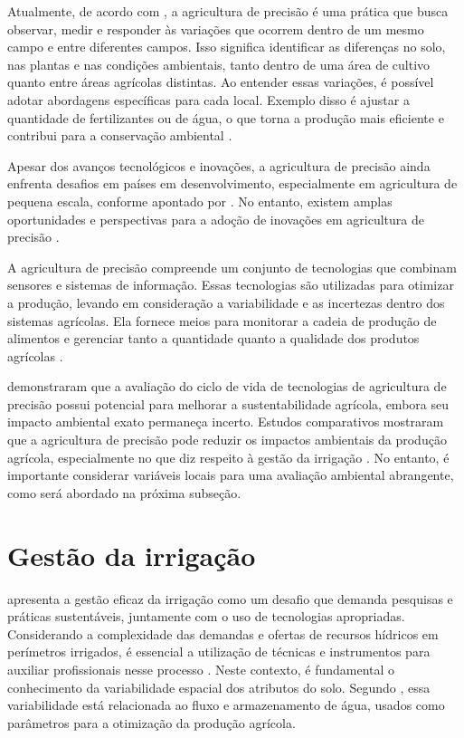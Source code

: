 Atualmente, de acordo com \textcite{Lamine_precision2024}, a agricultura de precisão é uma prática que busca observar, medir e responder às variações que ocorrem dentro de um mesmo campo e entre diferentes campos. Isso significa identificar as diferenças no solo, nas plantas e nas condições ambientais, tanto dentro de uma área de cultivo quanto entre áreas agrícolas distintas. Ao entender essas variações, é possível adotar abordagens específicas para cada local. Exemplo disso é ajustar a quantidade de fertilizantes ou de água, o que torna a produção mais eficiente e contribui para a conservação ambiental \parencite{Lamine_precision2024}.

Apesar dos avanços tecnológicos e inovações, a agricultura de precisão ainda enfrenta desafios em países em desenvolvimento, especialmente em agricultura de pequena escala, conforme apontado por \textcite{Lamine_precision2024}. No entanto, existem amplas oportunidades e perspectivas para a adoção de inovações em agricultura de precisão \parencite{Lamine_precision2024}.

A agricultura de precisão compreende um conjunto de tecnologias que combinam sensores e sistemas de informação. Essas tecnologias são utilizadas para otimizar a produção, levando em consideração a variabilidade e as incertezas dentro dos sistemas agrícolas. Ela fornece meios para monitorar a cadeia de produção de alimentos e gerenciar tanto a quantidade quanto a qualidade dos produtos agrícolas \parencite{Gebbers_precision2010}.

\textcite{Francisco_precision2024} demonstraram que a avaliação do ciclo de vida de tecnologias de agricultura de precisão possui potencial para melhorar a sustentabilidade agrícola, embora seu impacto ambiental exato permaneça incerto. Estudos comparativos mostraram que a agricultura de precisão pode reduzir os impactos ambientais da produção agrícola, especialmente no que diz respeito à gestão da irrigação \parencite{Francisco_precision2024}. No entanto, é importante considerar variáveis locais para uma avaliação ambiental abrangente, como será abordado na próxima subseção.

\section{Gestão da irrigação}

\textcite{Burton_irrigation2010} apresenta a gestão eficaz da irrigação como um desafio que demanda pesquisas e práticas sustentáveis, juntamente com o uso de tecnologias apropriadas. 
Considerando a complexidade das demandas e ofertas de recursos hídricos em perímetros irrigados, é essencial a utilização de técnicas e instrumentos para auxiliar profissionais nesse processo \parencite{Ramos_irrigacao2022}. Neste contexto, é fundamental o conhecimento da variabilidade espacial dos atributos do solo. Segundo \textcite{Ramos_irrigacao2022}, essa variabilidade está relacionada ao fluxo e armazenamento de água, usados como parâmetros para a otimização da produção agrícola.

